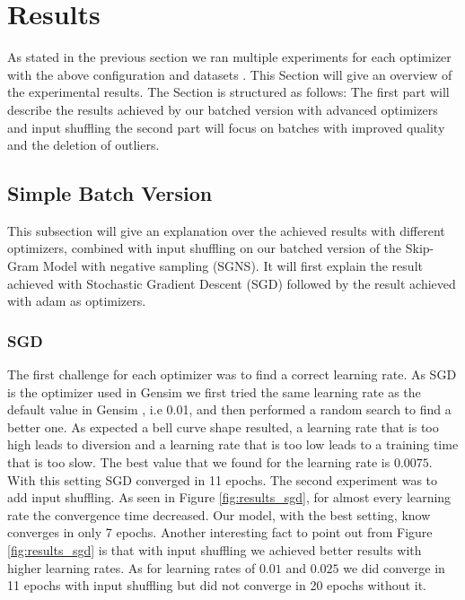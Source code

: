 

\section{Results}\label{sec:results}
As stated in the previous section we ran multiple experiments for each optimizer with the above configuration and datasets . This Section will  give an overview of the experimental results. 
The Section is structured as follows: The first part will describe the results achieved by our batched version with advanced optimizers and input shuffling the second part will focus on batches with improved quality and the deletion of outliers. 

\subsection{Simple Batch Version}
This subsection will give an explanation over the achieved results with different optimizers, combined with input shuffling on our batched version of the Skip-Gram Model with negative sampling (SGNS). It will first explain the result achieved with Stochastic Gradient Descent (SGD) followed by the result achieved with adam as optimizers. 
\subsubsection{SGD}
The first challenge for each optimizer was to find a correct learning rate. As SGD is the optimizer used in Gensim \citep{gensim} we first tried the same learning rate as the default value in Gensim \citep{gensim}, i.e 0.01,  and then performed a random search to find a better one. As expected a bell curve shape resulted, a learning rate that is too high leads to diversion and a learning rate that is too low leads to a training time that is too slow. The best value that we found for the learning rate is $0.0075$. With this setting SGD converged in 11 epochs. The second experiment was to add input shuffling.
As seen in Figure \ref{fig:results_sgd}, for almost every learning rate the convergence time decreased. Our model, with the best setting, know converges in only 7 epochs. Another interesting fact to point out from Figure \ref{fig:results_sgd} is that with input shuffling we achieved better results with higher learning rates. As for learning rates of $0.01$ and $0.025$ we did converge in 11 epochs with input shuffling but did not converge in 20 epochs without it.

